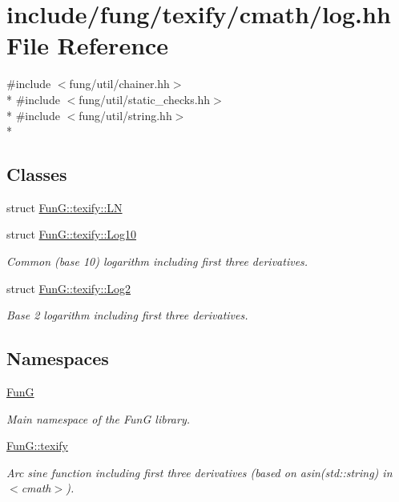 \hypertarget{texify_2cmath_2log_8hh}{\section{include/fung/texify/cmath/log.hh File Reference}
\label{texify_2cmath_2log_8hh}
}
{\ttfamily \#include $<$fung/util/chainer.\-hh$>$}\\*
{\ttfamily \#include $<$fung/util/static\-\_\-checks.\-hh$>$}\\*
{\ttfamily \#include $<$fung/util/string.\-hh$>$}\\*
\subsection*{Classes}
\begin{DoxyCompactItemize}
\item 
struct \hyperlink{structFunG_1_1texify_1_1LN}{Fun\-G\-::texify\-::\-L\-N}
\item 
struct \hyperlink{structFunG_1_1texify_1_1Log10}{Fun\-G\-::texify\-::\-Log10}
\begin{DoxyCompactList}\small\item\em Common (base 10) logarithm including first three derivatives. \end{DoxyCompactList}\item 
struct \hyperlink{structFunG_1_1texify_1_1Log2}{Fun\-G\-::texify\-::\-Log2}
\begin{DoxyCompactList}\small\item\em Base 2 logarithm including first three derivatives. \end{DoxyCompactList}\end{DoxyCompactItemize}
\subsection*{Namespaces}
\begin{DoxyCompactItemize}
\item 
\hyperlink{namespaceFunG}{Fun\-G}
\begin{DoxyCompactList}\small\item\em Main namespace of the Fun\-G library. \end{DoxyCompactList}\item 
\hyperlink{namespaceFunG_1_1texify}{Fun\-G\-::texify}
\begin{DoxyCompactList}\small\item\em Arc sine function including first three derivatives (based on asin(std\-::string) in $<$cmath$>$). \end{DoxyCompactList}\end{DoxyCompactItemize}
